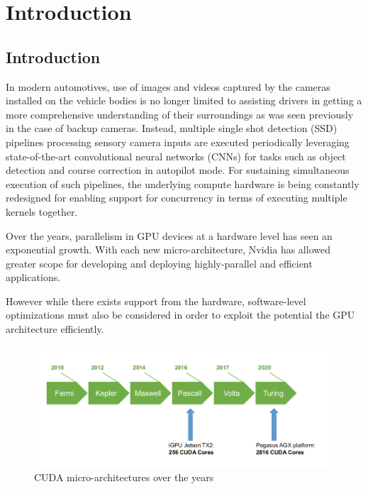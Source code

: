 
\chapter{Introduction} %

\label{Chapter 1} %


\section{Introduction}
      In modern automotives, use of images and videos captured by the cameras installed on the vehicle bodies is no longer limited to assisting drivers in getting a more comprehensive understanding of their surroundings as was seen previously in the case of backup cameras. Instead, multiple single shot detection (SSD) pipelines processing sensory camera inputs are executed periodically leveraging state-of-the-art convolutional neural networks (CNNs) for tasks such as object detection and course correction in autopilot mode. For sustaining simultaneous execution of such pipelines, the underlying compute hardware is being constantly redesigned for enabling support for concurrency in terms of executing multiple kernels together.

        Over the years, parallelism in GPU devices at a hardware level has seen an exponential growth. With each new micro-architecture, Nvidia has allowed greater scope for developing and deploying highly-parallel and efficient applications.
        
        However while there exists support from the hardware, software-level optimizations must also be considered in order to exploit the potential the GPU architecture efficiently.
    
    	\begin{figure}[ht] 
		\centering
		\includegraphics[scale=0.5]{Pictures/ch1/microarchitecture.png}
		\caption{CUDA micro-architectures over the years \label{fig:dagmapping}}
    \end{figure}  
    
